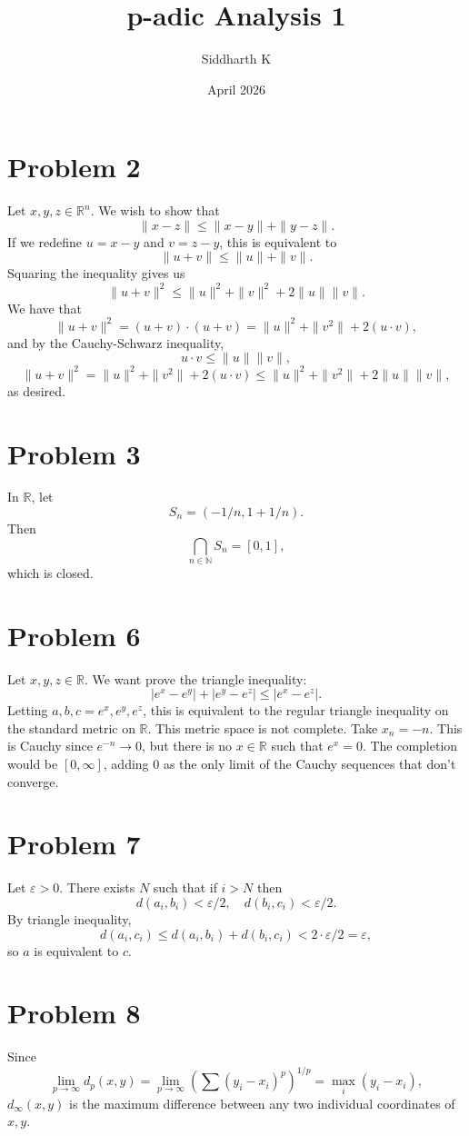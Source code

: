 \documentclass{article}
\title{p-adic Analysis 1}
\author{Siddharth K}
\date{April 2026}
\newcommand{\N}{\mathbb{N}}
\newcommand{\R}{\mathbb{R}}
\newcommand{\bigp}[1]{\left(#1\right)}
\newcommand{\eps}{\varepsilon}
\begin{document}
\maketitle

\section*{Problem 2}
Let $x, y, z \in \R^n$. We wish to show that
$$\|x - z\| \le \|x - y\| + \|y - z\|.$$
If we redefine $u = x - y$ and $v = z - y$, this is equivalent to
$$\|u + v\| \le \|u\| + \|v\|.$$
Squaring the inequality gives us
$$\|u + v\|^2 \le \|u\|^2 + \|v\|^2 + 2\|u\|\|v\|.$$
We have that
$$\|u + v\|^2 = (u + v)\cdot (u + v) = \|u\|^2 + \|v^2\| + 2(u \cdot v),$$
and by the Cauchy-Schwarz inequality,
$$u \cdot v \le \|u\|\|v\|,$$
$$\|u + v\|^2 = \|u\|^2 + \|v^2\| + 2(u \cdot v) \le \|u\|^2 + \|v^2\| + 2\|u\|\|v\|,$$
as desired.

\section*{Problem 3}
In $\R$, let
$$S_n = (-1/n, 1 + 1/n).$$
Then
$$\bigcap_{n \in \N} S_n = [0, 1],$$
which is closed.

\section*{Problem 6}
Let $x, y, z \in \R$. We want prove the triangle inequality:
$$|e^x - e^y| + |e^y - e^z| \le |e^x - e^z|.$$
Letting $a, b, c = e^x, e^y, e^z$, this is equivalent to the regular triangle inequality on the standard metric on $\R$.
This metric space is not complete. Take $x_n = -n$. This is Cauchy since $e^{-n} \to 0$, but there is no $x \in \R$ such that $e^x = 0$. The completion would be $[0, \infty]$, adding $0$ as the only limit of the Cauchy sequences that don't converge.

\section*{Problem 7}
Let $\eps > 0$. There exists $N$ such that if $i > N$ then
$$d(a_i, b_i) < \eps/2, \quad d(b_i, c_i) < \eps/2.$$
By triangle inequality,
$$d(a_i, c_i) \le d(a_i, b_i) + d(b_i, c_i) < 2 \cdot \eps/2 = \eps,$$
so $a$ is equivalent to $c$.

\section*{Problem 8}
Since
$$\lim_{p \to \infty} d_p(x, y) = \lim_{p \to \infty} \bigp{\sum (y_i - x_i)^p}^{1/p} = \max_i(y_i - x_i),$$
$d_\infty(x, y)$ is the maximum difference between any two individual coordinates of $x, y$.
\end{document}
